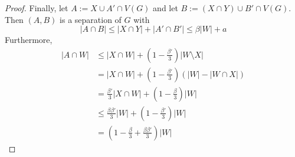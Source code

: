 \documentclass{patmorin}
\begin{document}
\begin{proof}
  Finally, let $A:=X\cup A'\cap V(G)$ and let $B:=(X\cap Y)\cup B'\cap V(G)$.  Then $(A,B)$ is a separation of $G$ with
  \[
    |A\cap B|\le |X\cap Y|+|A'\cap B'| \le \beta|W| + a
  \]
  Furthermore,
  \begin{align*}
    |A\cap W| & \le |X\cap W|+(1-\tfrac{\beta'}{3})|W\setminus X| \\
       & = |X\cap W|+(1-\tfrac{\beta'}{3})(|W|-|W\cap X|) \\
       & = \tfrac{\beta'}{3}|X\cap W|+(1-\tfrac{\beta}{3})|W| \\
       & \le \tfrac{\beta\beta'}{3}|W|+(1-\tfrac{\beta'}{3})|W| \\
       & = (1-\tfrac{\beta}{3}+\tfrac{\beta\beta'}{3})|W|
  \end{align*}
\end{proof}





\end{document}
